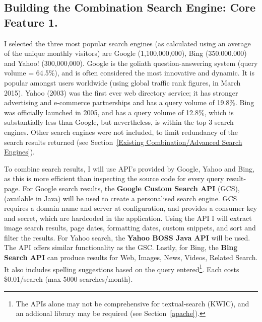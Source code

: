 \documentclass[a4paper, 10pt]{article}
\begin{document}
\subsection{Building the Combination Search Engine: Core Feature 1.} 
I selected the three most popular search engines (as calculated using an average of the unique monthly visitors) are Google (1,100,000,000), Bing (350.000.000) and Yahoo! (300,000,000)\cite{ebiz}. Google is the goliath question-answering system (query volume = 64.5\%)\cite{adam}, and is often considered the most innovative and dynamic. It is popular amongst users worldwide (using global traffic rank figures, in March 2015). Yahoo (2003) was the first ever web directory service; it has stronger advertising and e-commerce partnerships and has a query volume of 19.8\%. Bing was officially launched in 2005, and has a query volume of 12.8\%, which is substantially less than Google, but nevertheless, is within the top 3 search engines. Other search engines were not included, to limit redundancy of the search results returned (see Section~\ref{Existing Combination/Advanced Search Engines}). 

To combine search results, I will use API’s provided by Google, Yahoo and Bing, as this is more efficient than inspecting the source code for every query result-page. For Google search results, the \textbf{Google Custom Search API} (GCS), (available in Java) will be used to create a personalised search engine. GCS requires a domain name and server at configuration, and provides a consumer key and secret, which are hardcoded in the application. Using the API I will extract image search results, page dates, formatting dates, custom snippets, and sort and filter the results. For Yahoo search, the \textbf{Yahoo BOSS Java API} will be used. The API offers similar functionality as the GSC. Lastly, for Bing, the \textbf{Bing Search API} can produce results for Web, Images, News, Videos, Related Search. It also includes spelling suggestions based on the query entered\footnote{The APIs alone may not be comprehensive for textual-search (KWIC), and an addional library may be required (see Section~\ref{apache}).}. Each costs \$0.01/search (max 5000 searches/month).
\end{document}
